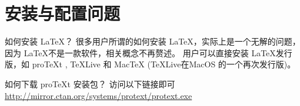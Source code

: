\section{安装与配置问题}

\begin{faq}{如何安装 \LaTeX{}？}
  很多用户所谓的如何安装 \LaTeX，实际上是一个无解的问题，因为 \LaTeX 不是一款软件，相关概念不再赘述。
  用户可以直接安装 \LaTeX 发行版，如 proTeXt , TeXLive 和 MacTeX (TeXLive在MacOS 的一个再次发行版)。
\end{faq}

\begin{faq}{如何下载 proTeXt 安装包？}
  访问以下链接即可
  \url{http://mirror.ctan.org/systems/protext/protext.exe}
\end{faq}
